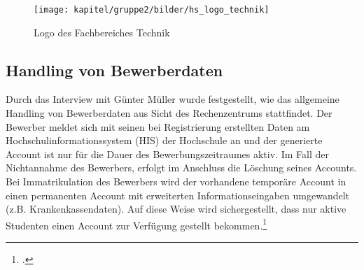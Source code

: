 \begin{figure}[h!]
	\centering
	\texttt{[image: kapitel/gruppe2/bilder/hs\_logo\_technik]}
	\caption{Logo des Fachbereiches Technik\protect\footnotemark}
	\label{fig_logo_fb_technik}
\end{figure}

\subsection{Handling von Bewerberdaten}
Durch das Interview mit Günter Müller wurde festgestellt, wie das allgemeine Handling von Bewerberdaten aus Sicht des Rechenzentrums stattfindet. 
Der Bewerber meldet sich mit seinen bei Registrierung erstellten Daten am Hochschulinformationssystem (HIS) der Hochschule an und der generierte Account ist nur für die Dauer des Bewerbungszeitraumes aktiv. Im Fall der Nichtannahme des Bewerbers, erfolgt im Anschluss die Löschung seines Accounts. Bei Immatrikulation des Bewerbers wird der vorhandene temporäre Account in einen permanenten Account mit erweiterten Informationseingaben umgewandelt (z.B. Krankenkassendaten). Auf diese Weise wird sichergestellt, dass nur aktive Studenten einen Account zur Verfügung gestellt bekommen.\footcite[Vgl.][]{gunter_muller_interview}
